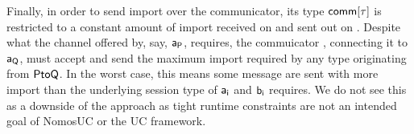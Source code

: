 Finally, in order to send import over the communicator, its type ${\mathsf {comm[\tau]}}$ is restricted to a constant amount of import received on  and sent out on .
Despite what the channel offered by, say, $\mathsf{a_P}$, requires, the commuicator , connecting it to $\mathsf{a_Q}$, must accept and send the maximum import required by any type originating from $\mathsf{PtoQ}$.
In the worst case, this means some message are sent with more import than the underlying session type of $\mathsf{a_i}$ and $\mathsf{b_i}$ requires.
We do not see this as a downside of the approach as tight runtime constraints are not an intended goal of NomosUC or the UC framework.
